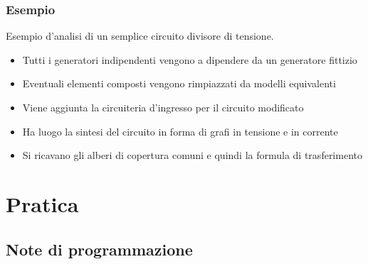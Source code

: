\begin{frame}
 \frametitle{Esempio}

 Esempio d'analisi di un semplice circuito \alert<1>{divisore di tensione}.

 \begin{center}
  \begin{overprint}
  \end{overprint}
 \end{center}

 \begin{itemize}
  \item<2-> Tutti i generatori indipendenti vengono a dipendere da un generatore fittizio
  \item<3-> Eventuali elementi composti vengono rimpiazzati da modelli equivalenti
  \item<4-> Viene aggiunta la circuiteria d'ingresso per il circuito modificato
  \item<5-> Ha luogo la sintesi del circuito in forma di grafi in tensione e in corrente
  \item<6-> Si ricavano gli alberi di copertura comuni e quindi la formula di trasferimento
 \end{itemize}

\end{frame}


\section{Pratica}

\subsection{Note di programmazione}


